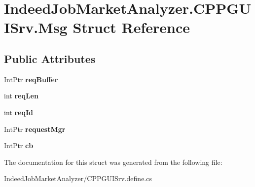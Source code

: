 \hypertarget{struct_indeed_job_market_analyzer_1_1_c_p_p_g_u_i_srv_1_1_msg}{}\section{Indeed\+Job\+Market\+Analyzer.\+C\+P\+P\+G\+U\+I\+Srv.\+Msg Struct Reference}
\label{struct_indeed_job_market_analyzer_1_1_c_p_p_g_u_i_srv_1_1_msg}
\subsection*{Public Attributes}
\begin{DoxyCompactItemize}
\item 
\hypertarget{struct_indeed_job_market_analyzer_1_1_c_p_p_g_u_i_srv_1_1_msg_ad2c853dd27678aea4278f5183bebbab9}{}Int\+Ptr {\bfseries req\+Buffer}\label{struct_indeed_job_market_analyzer_1_1_c_p_p_g_u_i_srv_1_1_msg_ad2c853dd27678aea4278f5183bebbab9}

\item 
\hypertarget{struct_indeed_job_market_analyzer_1_1_c_p_p_g_u_i_srv_1_1_msg_aac7a8772932559a184abe42b9ef76a1e}{}int {\bfseries req\+Len}\label{struct_indeed_job_market_analyzer_1_1_c_p_p_g_u_i_srv_1_1_msg_aac7a8772932559a184abe42b9ef76a1e}

\item 
\hypertarget{struct_indeed_job_market_analyzer_1_1_c_p_p_g_u_i_srv_1_1_msg_a5ba15921929109f597886bb06a435064}{}int {\bfseries req\+Id}\label{struct_indeed_job_market_analyzer_1_1_c_p_p_g_u_i_srv_1_1_msg_a5ba15921929109f597886bb06a435064}

\item 
\hypertarget{struct_indeed_job_market_analyzer_1_1_c_p_p_g_u_i_srv_1_1_msg_a0e56ed12597640a70c295aa09fef75a2}{}Int\+Ptr {\bfseries request\+Mgr}\label{struct_indeed_job_market_analyzer_1_1_c_p_p_g_u_i_srv_1_1_msg_a0e56ed12597640a70c295aa09fef75a2}

\item 
\hypertarget{struct_indeed_job_market_analyzer_1_1_c_p_p_g_u_i_srv_1_1_msg_a25802a414643fabdf9591c6722b4d39f}{}Int\+Ptr {\bfseries cb}\label{struct_indeed_job_market_analyzer_1_1_c_p_p_g_u_i_srv_1_1_msg_a25802a414643fabdf9591c6722b4d39f}

\end{DoxyCompactItemize}


The documentation for this struct was generated from the following file\+:\begin{DoxyCompactItemize}
\item 
Indeed\+Job\+Market\+Analyzer/C\+P\+P\+G\+U\+I\+Srv.\+define.\+cs\end{DoxyCompactItemize}
